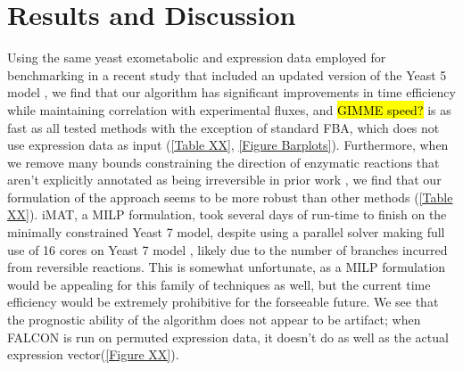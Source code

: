 



\section{Results and Discussion}

Using the same yeast exometabolic and expression data employed for
benchmarking in a recent study \citep{Lee2012} that included an
updated version of the Yeast 5 model \citep{Heavner2012}, we find that
our algorithm has significant improvements in time efficiency while
maintaining correlation with experimental fluxes, and \hl{GIMME
  speed?} is as fast as all tested methods with the exception of
standard FBA, which does not use expression data as input (\ref{Table
  XX}, \ref{Figure Barplots}). Furthermore, when we remove many bounds
constraining the direction of enzymatic reactions that aren't
explicitly annotated as being irreversible in prior work
\citep{Lee2012}, we find that our formulation of the approach seems to
be more robust than other methods (\ref{Table XX}). iMAT, a MILP
formulation, took several days of run-time to finish on the minimally
constrained Yeast 7 model, despite using a parallel solver making full
use of 16 cores \citep{gurobi} on Yeast 7 model \citep{Aung2013},
likely due to the number of branches incurred from reversible
reactions. This is somewhat unfortunate, as a MILP formulation would
be appealing for this family of techniques as well, but the current
time efficiency would be extremely prohibitive for the forseeable
future. We see that the prognostic ability of the algorithm does not
appear to be artifact; when FALCON is run on permuted expression data,
it doesn't do as well as the actual expression vector(\ref{Figure
  XX}).

